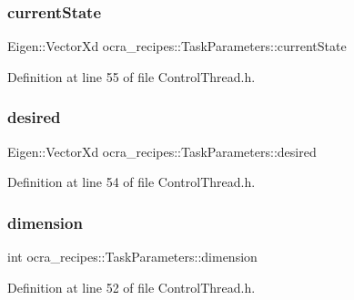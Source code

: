 \subsubsection{\texorpdfstring{current\+State}{currentState}}
{\footnotesize\ttfamily Eigen\+::\+Vector\+Xd ocra\+\_\+recipes\+::\+Task\+Parameters\+::current\+State}



Definition at line 55 of file Control\+Thread.\+h.

\hypertarget{classocra__recipes_1_1TaskParameters_a1dbe7dbb189079f4c8b7cd8f60a3b33e}{}\label{classocra__recipes_1_1TaskParameters_a1dbe7dbb189079f4c8b7cd8f60a3b33e} 
\subsubsection{\texorpdfstring{desired}{desired}}
{\footnotesize\ttfamily Eigen\+::\+Vector\+Xd ocra\+\_\+recipes\+::\+Task\+Parameters\+::desired}



Definition at line 54 of file Control\+Thread.\+h.

\hypertarget{classocra__recipes_1_1TaskParameters_a9102d4eee6b4dedb4bfb9181d348ed9c}{}\label{classocra__recipes_1_1TaskParameters_a9102d4eee6b4dedb4bfb9181d348ed9c} 
\subsubsection{\texorpdfstring{dimension}{dimension}}
{\footnotesize\ttfamily int ocra\+\_\+recipes\+::\+Task\+Parameters\+::dimension}



Definition at line 52 of file Control\+Thread.\+h.

\hypertarget{classocra__recipes_1_1TaskParameters_a1e4df01753f82bc359f9632817e61e2b}{}\label{classocra__recipes_1_1TaskParameters_a1e4df01753f82bc359f9632817e61e2b} 
